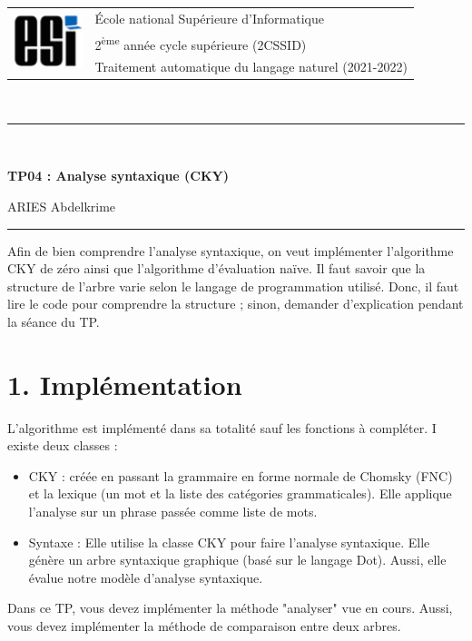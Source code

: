 \documentclass[11pt, a4paper]{article}
\begin{document}

\noindent
\begin{tabular}{ll}
\multirow{3}{*}{\includegraphics[width=2cm]{../../../img/esi-logo.png}} & \'Ecole national Supérieure d'Informatique\\
& 2\textsuperscript{ème} année cycle supérieure (2CSSID)\\
& Traitement automatique du langage naturel (2021-2022)
\end{tabular}\\[.25cm]
\noindent\rule{\textwidth}{1pt}\\%
\begin{center}
{\LARGE \textbf{TP04 : Analyse syntaxique (CKY)}}
\begin{flushright}
	ARIES Abdelkrime
\end{flushright}
\end{center}
\noindent\rule{\textwidth}{1pt}

Afin de bien comprendre l'analyse syntaxique, on veut implémenter l'algorithme CKY de zéro ainsi que l'algorithme d'évaluation naïve.
Il faut savoir que la structure de l'arbre varie selon le langage de programmation utilisé.
Donc, il faut lire le code pour comprendre la structure ; sinon, demander d'explication pendant la séance du TP.

\section*{1. Implémentation}

L'algorithme est implémenté dans sa totalité sauf les fonctions à compléter.
I existe deux classes : 
\begin{itemize}
	\item CKY : créée en passant la grammaire en forme normale de Chomsky (FNC) et la lexique (un mot et la liste des catégories grammaticales). 
	Elle applique l'analyse sur un phrase passée comme liste de mots.
	\item Syntaxe : Elle utilise la classe CKY pour faire l'analyse syntaxique. 
	Elle génère un arbre syntaxique graphique (basé sur le langage Dot).
	Aussi, elle évalue notre modèle d'analyse syntaxique.
\end{itemize}

Dans ce TP, vous devez implémenter la méthode "analyser" vue en cours.
Aussi, vous devez implémenter la méthode de comparaison entre deux arbres.
\end{document}
